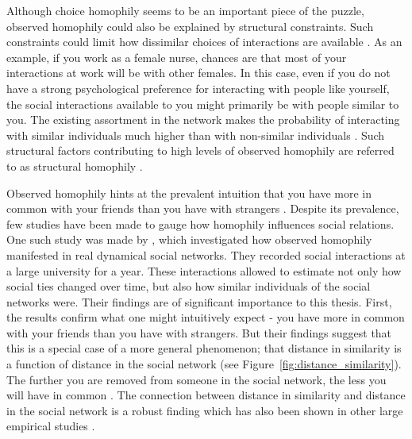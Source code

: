 \documentclass[11pt]{article}
\begin{document}
Although choice homophily seems to be an important piece of the puzzle, observed homophily could also be explained by structural constraints. Such constraints could limit how dissimilar choices of interactions are available \cite{peixoto_disentangling_2022}. As an example, if you work as a female nurse, chances are that most of your interactions at work will be with other females. 
In this case, even if you do not have a strong psychological preference for interacting with people like yourself, the social interactions available to you might primarily be with people similar to you. 
The existing assortment in the network makes the probability of interacting with similar individuals much higher than with non-similar individuals \cite{peixoto_disentangling_2022}. Such structural factors contributing to high levels of observed homophily are referred to as structural homophily \cite{asikainen_cumulative_2020,mcpherson_birds_2001,winter_you_2020}. 

\noindent Observed homophily hints at the prevalent intuition that you have more in common with your friends than you have with strangers \cite{mcpherson_birds_2001}.
Despite its prevalence, few studies have been made to gauge how homophily influences social relations. One such study was made by , which investigated how observed homophily manifested in real dynamical social networks. They recorded social interactions at a large university for a year. These interactions allowed  to estimate not only how social ties changed over time, but also how similar individuals of the social networks were. Their findings are of significant importance to this thesis. First, the results confirm what one might intuitively expect - you have more in common with your friends than you have with strangers. But their findings suggest that this is a special case of a more general phenomenon; that distance in similarity is a function of distance in the social network (see Figure~\ref{fig:distance_similarity}). The further you are removed from someone in the social network, the less you will have in common \cite{kossinets_origins_2009}. 
The connection between distance in similarity and distance in the social network is a robust finding which has also been shown in other large empirical studies \cite{bener_empirical_2016,crandall_feedback_2008}.
\end{document}
